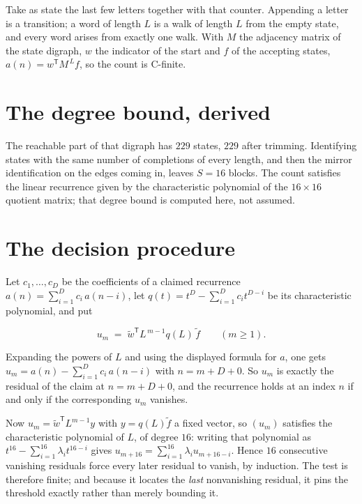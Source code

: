 \documentclass[11pt]{article}
\theoremstyle{definition}
\begin{document}
Take as state the last few letters together with that counter. Appending a letter is a transition; a word of length $L$ is a walk of length $L$ from the empty state, and every word arises from exactly one walk. With $M$ the adjacency matrix of the state digraph, $w$ the indicator of the start and $f$ of the accepting states, $a(n) = w^{\mathsf T}M^{\,L}f$, so the count is C-finite.

\section{The degree bound, derived}

The reachable part of that digraph has $229$ states, $229$ after trimming. Identifying states with the same number of completions of every length, and then the mirror identification on the edges coming in, leaves $S = 16$ blocks. The count satisfies the linear recurrence given by the characteristic polynomial of the $16\times16$ quotient matrix; that degree bound is computed here, not assumed.

\section{The decision procedure}

Let $c_1,\dots,c_D$ be the coefficients of a claimed recurrence $a(n) = \sum_{i=1}^{D} c_i\,a(n-i)$, let $q(t) = t^{D} - \sum_{i=1}^{D} c_i t^{D-i}$ be its characteristic polynomial, and put

\[u_m \;=\; \tilde w^{\mathsf T} L^{\,m-1} q(L)\,\tilde f \qquad (m \ge 1).\]

Expanding the powers of $L$ and using the displayed formula for $a$, one gets $u_m = a(n) - \sum_{i=1}^{D} c_i\,a(n-i)$ with $n = m + D + 0$. So $u_m$ is exactly the residual of the claim at $n = m + D + 0$, and the recurrence holds at an index $n$ if and only if the corresponding $u_m$ vanishes.

Now $u_m = \tilde w^{\mathsf T} L^{m-1} y$ with $y = q(L)\tilde f$ a fixed vector, so $(u_m)$ satisfies the characteristic polynomial of $L$, of degree $16$: writing that polynomial as $t^{16} - \sum_{i=1}^{16} \lambda_i t^{16-i}$ gives $u_{m+16} = \sum_{i=1}^{16} \lambda_i u_{m+16-i}$. Hence $16$ consecutive vanishing residuals force every later residual to vanish, by induction. The test is therefore finite; and because it locates the {\itshape last} nonvanishing residual, it pins the threshold exactly rather than merely bounding it.
\end{document}

